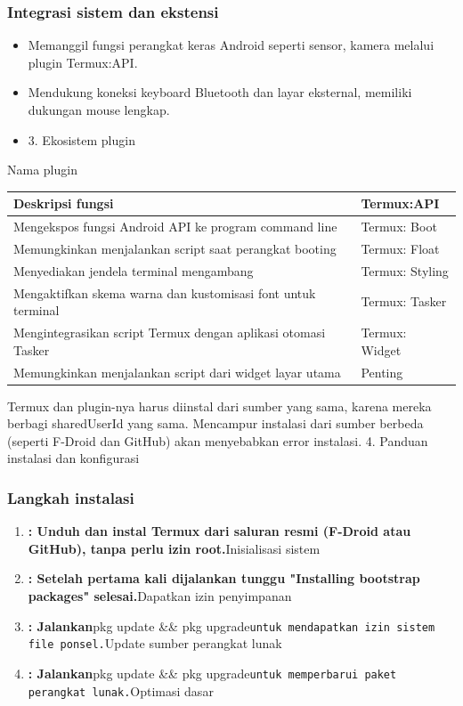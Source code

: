 \subsubsection*{Integrasi sistem dan ekstensi}

\begin{itemize}
  \item Memanggil fungsi perangkat keras Android seperti sensor, kamera melalui plugin Termux:API.
  \item Mendukung koneksi keyboard Bluetooth dan layar eksternal, memiliki dukungan mouse lengkap.
  \item 3. Ekosistem plugin
\end{itemize}


Nama plugin

\begin{center}
\begin{tabularx}{\linewidth}{|X|X|}
\hline
\textbf{Deskripsi fungsi} & \textbf{Termux:API} \tabularnewline
\hline
Mengekspos fungsi Android API ke program command line & Termux: Boot \tabularnewline
Memungkinkan menjalankan script saat perangkat booting & Termux: Float \tabularnewline
Menyediakan jendela terminal mengambang & Termux: Styling \tabularnewline
Mengaktifkan skema warna dan kustomisasi font untuk terminal & Termux: Tasker \tabularnewline
Mengintegrasikan script Termux dengan aplikasi otomasi Tasker & Termux: Widget \tabularnewline
Memungkinkan menjalankan script dari widget layar utama & Penting \tabularnewline
\hline
\end{tabularx}
\end{center}

\begin{tcbwarn}{Termux dan plugin-nya harus diinstal dari sumber yang sama, karena mereka berbagi sharedUserId yang sama. Mencampur instalasi dari sumber berbeda (seperti F-Droid dan GitHub) akan menyebabkan error instalasi.}
4. Panduan instalasi dan konfigurasi

\end{tcbwarn}


\subsubsection*{Langkah instalasi}

\begin{enumerate}
  \item \textbf{: Unduh dan instal Termux dari saluran resmi (F-Droid atau GitHub), tanpa perlu izin root.}Inisialisasi sistem
  \item \textbf{: Setelah pertama kali dijalankan tunggu "Installing bootstrap packages" selesai.}Dapatkan izin penyimpanan
  \item \textbf{: Jalankan}pkg update \&\& pkg upgrade\texttt{untuk mendapatkan izin sistem file ponsel.\allowbreak }Update sumber perangkat lunak
  \item \textbf{: Jalankan}pkg update \&\& pkg upgrade\texttt{untuk memperbarui paket perangkat lunak.\allowbreak }Optimasi dasar
\end{enumerate}

